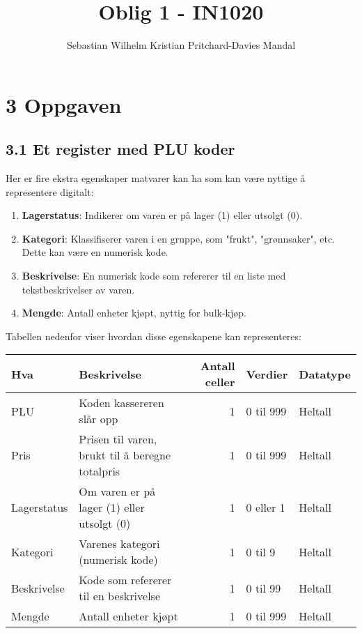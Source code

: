 \documentclass[11pt, oneside]{article}   	%
\title{Oblig 1 - IN1020}
\author{Sebastian Wilhelm Kristian Pritchard-Davies Mandal}
\date{}
\begin{document}
\maketitle

\section*{3 Oppgaven}

\subsection*{3.1 Et register med PLU koder}

Her er fire ekstra egenskaper matvarer kan ha som kan være nyttige å representere digitalt:

\begin{enumerate}
    \item \textbf{Lagerstatus}: Indikerer om varen er på lager (1) eller utsolgt (0).
    \item \textbf{Kategori}: Klassifiserer varen i en gruppe, som "frukt", "grønnsaker", etc. Dette kan være en numerisk kode.
    \item \textbf{Beskrivelse}: En numerisk kode som refererer til en liste med tekstbeskrivelser av varen.
    \item \textbf{Mengde}: Antall enheter kjøpt, nyttig for bulk-kjøp.
\end{enumerate}

Tabellen nedenfor viser hvordan disse egenskapene kan representeres:

\begin{tabular}{|l|l|r|l|l|}
    \hline
    Hva            & Beskrivelse                                          & Antall celler & Verdier      & Datatype \\
    \hline
    PLU            & Koden kassereren slår opp                           & 1             & 0 til 999    & Heltall  \\
    Pris           & Prisen til varen, brukt til å beregne totalpris      & 1             & 0 til 999    & Heltall  \\
    Lagerstatus    & Om varen er på lager (1) eller utsolgt (0)           & 1             & 0 eller 1    & Heltall  \\
    Kategori       & Varenes kategori (numerisk kode)                     & 1             & 0 til 9      & Heltall  \\
    Beskrivelse    & Kode som refererer til en beskrivelse                 & 1             & 0 til 99     & Heltall  \\
    Mengde         & Antall enheter kjøpt                                & 1             & 0 til 999    & Heltall  \\
    \hline
\end{tabular}
\end{document}
